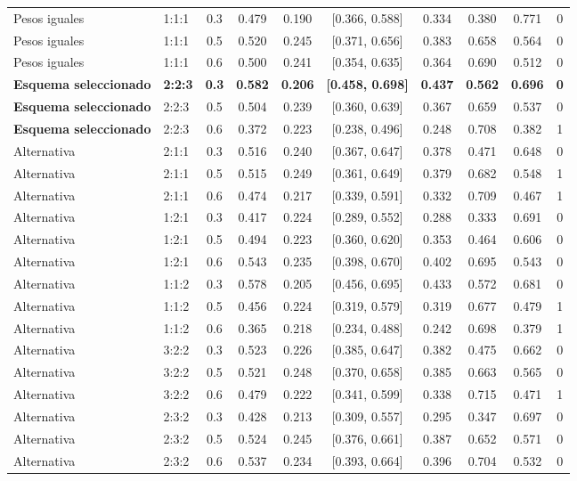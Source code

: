 \begin{tabular}{llccccccc c}
\addlinespace
Pesos iguales & 1:1:1 & 0.3 & 0.479 & 0.190 & [0.366, 0.588] & 0.334 & 0.380 & 0.771 & 0 \\
Pesos iguales & 1:1:1 & 0.5 & 0.520 & 0.245 & [0.371, 0.656] & 0.383 & 0.658 & 0.564 & 0 \\
Pesos iguales & 1:1:1 & 0.6 & 0.500 & 0.241 & [0.354, 0.635] & 0.364 & 0.690 & 0.512 & 0 \\
\addlinespace
\textbf{\textbf{Esquema seleccionado}} & \textbf{2:2:3} & \textbf{0.3} & \textbf{0.582} & \textbf{0.206} & \textbf{[0.458, 0.698]} & \textbf{0.437} & \textbf{0.562} & \textbf{0.696} & \textbf{0} \\
\textbf{Esquema seleccionado} & 2:2:3 & 0.5 & 0.504 & 0.239 & [0.360, 0.639] & 0.367 & 0.659 & 0.537 & 0 \\
\textbf{Esquema seleccionado} & 2:2:3 & 0.6 & 0.372 & 0.223 & [0.238, 0.496] & 0.248 & 0.708 & 0.382 & 1 \\
\addlinespace
Alternativa & 2:1:1 & 0.3 & 0.516 & 0.240 & [0.367, 0.647] & 0.378 & 0.471 & 0.648 & 0 \\
Alternativa & 2:1:1 & 0.5 & 0.515 & 0.249 & [0.361, 0.649] & 0.379 & 0.682 & 0.548 & 1 \\
Alternativa & 2:1:1 & 0.6 & 0.474 & 0.217 & [0.339, 0.591] & 0.332 & 0.709 & 0.467 & 1 \\
Alternativa & 1:2:1 & 0.3 & 0.417 & 0.224 & [0.289, 0.552] & 0.288 & 0.333 & 0.691 & 0 \\
Alternativa & 1:2:1 & 0.5 & 0.494 & 0.223 & [0.360, 0.620] & 0.353 & 0.464 & 0.606 & 0 \\
Alternativa & 1:2:1 & 0.6 & 0.543 & 0.235 & [0.398, 0.670] & 0.402 & 0.695 & 0.543 & 0 \\
Alternativa & 1:1:2 & 0.3 & 0.578 & 0.205 & [0.456, 0.695] & 0.433 & 0.572 & 0.681 & 0 \\
Alternativa & 1:1:2 & 0.5 & 0.456 & 0.224 & [0.319, 0.579] & 0.319 & 0.677 & 0.479 & 1 \\
Alternativa & 1:1:2 & 0.6 & 0.365 & 0.218 & [0.234, 0.488] & 0.242 & 0.698 & 0.379 & 1 \\
Alternativa & 3:2:2 & 0.3 & 0.523 & 0.226 & [0.385, 0.647] & 0.382 & 0.475 & 0.662 & 0 \\
Alternativa & 3:2:2 & 0.5 & 0.521 & 0.248 & [0.370, 0.658] & 0.385 & 0.663 & 0.565 & 0 \\
Alternativa & 3:2:2 & 0.6 & 0.479 & 0.222 & [0.341, 0.599] & 0.338 & 0.715 & 0.471 & 1 \\
Alternativa & 2:3:2 & 0.3 & 0.428 & 0.213 & [0.309, 0.557] & 0.295 & 0.347 & 0.697 & 0 \\
Alternativa & 2:3:2 & 0.5 & 0.524 & 0.245 & [0.376, 0.661] & 0.387 & 0.652 & 0.571 & 0 \\
Alternativa & 2:3:2 & 0.6 & 0.537 & 0.234 & [0.393, 0.664] & 0.396 & 0.704 & 0.532 & 0 \\
\bottomrule
\end{tabular}%
